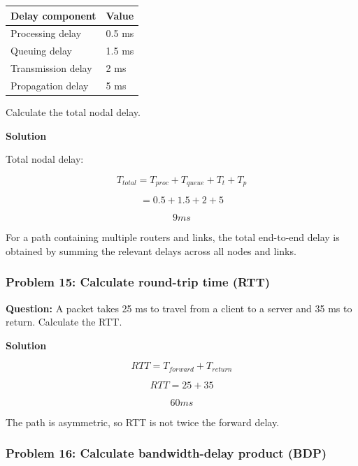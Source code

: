 \begin{center}
\begin{tabularx}{\linewidth}{p{5.5cm} X}
\toprule
\textbf{Delay component} & \textbf{Value} \\
\midrule
Processing delay & 0.5 ms \\
Queuing delay & 1.5 ms \\
Transmission delay & 2 ms \\
Propagation delay & 5 ms \\
\bottomrule
\end{tabularx}
\end{center}

Calculate the total nodal delay.

\textbf{Solution}

Total nodal delay:



\[
T_{total}=T_{proc}+T_{queue}+T_t+T_p
\]





\[
=0.5+1.5+2+5
\]





\[
\boxed{9ms}
\]



For a path containing multiple routers and links, the total end-to-end delay is obtained by summing the relevant delays across all nodes and links.

\subsubsection*{Problem 15: Calculate round-trip time (RTT)}

\textbf{Question:} A packet takes 25 ms to travel from a client to a server and 35 ms to return. Calculate the RTT.

\textbf{Solution}



\[
RTT=T_{forward}+T_{return}
\]





\[
RTT=25+35
\]





\[
\boxed{60ms}
\]



The path is asymmetric, so RTT is not twice the forward delay.

\subsubsection*{Problem 16: Calculate bandwidth-delay product (BDP)}


